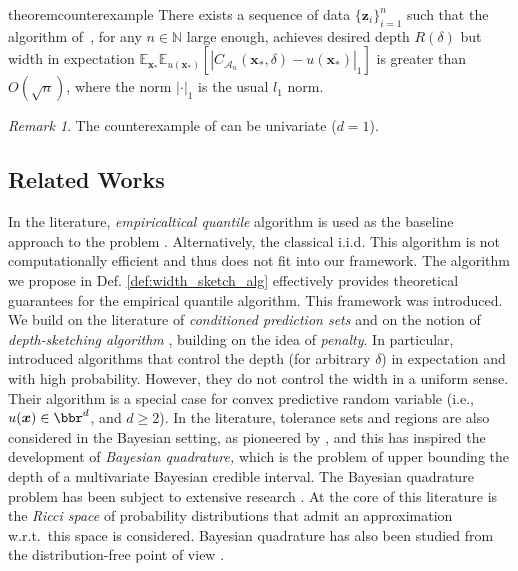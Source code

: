 \documentclass{article} %
\theoremstyle{remark}
\newtheorem{remark}{Remark}[section]
\theoremstyle{definition}      %
\begin{document}
\begin{restatable}[Counterexample]{theorem}{counterexample}\label{prop:counterexample}
  There exists a sequence of data  $\{ \bm z_i \}_{i=1}^n$ such that the algorithm of~\cite{angelopoulos2024conformal}, for any $n \in \mathbb{N}$ large enough, achieves desired depth $R(\delta)$ but width in expectation $\mathbb{E}_{\bm{x}_*} \mathbb{E}_{u(\bm{x_*})}[| C_{\mathcal{A}_{n}}(\bm{x_*},\delta) - u(\bm{x_*})|_1]$ is greater than $O(\sqrt{n})$, where the norm $|\cdot|_1$ is the usual $l_1$ norm.
\end{restatable}
\begin{remark}
  \label{rem:counterexample}
  The counterexample of \cite{angelopoulos2024conformal} can be univariate ($d=1$). 
\end{remark}

\subsection{Related Works} 

In the literature, \emph{empiricaltical quantile} algorithm is used as the baseline approach to the problem \cite[see, e.g.,][]{tukey1947nonparametric,tukey1948nonparametric}. Alternatively, the classical i.i.d. This algorithm is not computationally efficient and thus does not fit into our framework. The algorithm we propose in Def. \ref{def:width_sketch_alg} effectively provides theoretical guarantees for the empirical quantile algorithm. This framework was introduced. We build on the literature of \emph{conditioned prediction sets} \citep[e.g.,][]{barber2021limits,bates2021distributionfree} and on the notion of \emph{depth-sketching algorithm} \citep{angelopoulos2024conformal}, building on the idea of \emph{penalty}. In particular,   \citet{angelopoulos2024conformal} introduced algorithms that control the depth (for arbitrary $\delta$) in expectation and with high probability. However, they do not control the width in a uniform sense. Their algorithm is a special case for convex predictive random variable (i.e., $u(\bm{x}) \in \bbr^{d}$, and $d \geq 2$). In the literature, tolerance sets and regions are also considered in the Bayesian setting, as pioneered by \citet{guttman1970statistical}, and this has inspired the development of \emph{Bayesian quadrature,} which is the problem of upper bounding the depth of a multivariate Bayesian credible interval. The Bayesian quadrature problem has been subject to extensive research \citep[see][and many other works that follow]{diaconis1988bayesian, karvonen2017classical,hobbhahn2022fast,hennig2022probabilistic}. At the core of this literature is the \emph{Ricci space} \citep{poincare1896calcul,diaconis1988bayesian} of probability distributions that admit an approximation w.r.t.~this space is considered. Bayesian quadrature has also been studied from the distribution-free point of view \citep[see][Sec. 2.4]{angelopoulos2023conformal}.
\end{document}

